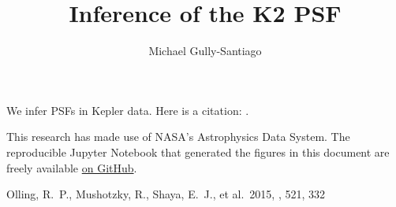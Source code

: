 \documentclass{rnaastex}
\begin{document}
\title{Inference of the K2 PSF}


\author[0000-0002-4020-3457]{Michael Gully-Santiago}


\section{}

We infer PSFs in Kepler data.  Here is a citation: \cite{2015Natur.521..332O}.


\acknowledgments

This research has made use of NASA's Astrophysics Data System.  The reproducible Jupyter Notebook that generated the figures in this document are freely available \href{https://github.com/gully/quigly}{on GitHub}.

\begin{thebibliography}{}

 Olling, R.~P., Mushotzky, R., Shaya, E.~J., et al.\ 2015, \nat, 521, 332

\end{thebibliography}
\end{document}
